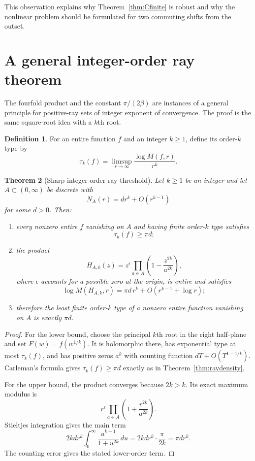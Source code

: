 \documentclass[11pt,oneside]{article}
\newtheorem{theorem}{Theorem}[section]
\theoremstyle{definition}
\newtheorem{definition}[theorem]{Definition}
\theoremstyle{remark}
\begin{document}
This observation explains why Theorem~\ref{thm:Cfinite} is robust and why the nonlinear
problem should be formulated for two commuting shifts from the outset.

\section{A general integer-order ray theorem}
\label{sec:generalray}

The fourfold product and the constant $\pi/(2\beta)$ are instances of a general principle
for positive-ray sets of integer exponent of convergence.  The proof is the same square-root
idea with a $k$th root.

\begin{definition}
For an entire function $f$ and an integer $k\ge1$, define its order-$k$ type by
\[
 \tau_k(f)=\limsup_{r\to\infty}\frac{\log M(f,r)}{r^k}.
\]
\end{definition}

\begin{theorem}[Sharp integer-order ray threshold]
\label{thm:generalray}
Let $k\ge1$ be an integer and let $A\subset(0,\infty)$ be discrete with
\begin{equation}
 N_A(r)=d r^k+O(r^{k-1})
 \label{eq:generalcount}
\end{equation}
for some $d>0$.  Then:
\begin{enumerate}
\item every nonzero entire $f$ vanishing on $A$ and having finite order-$k$ type satisfies
\[
 \tau_k(f)\ge\pi d;
\]
\item the product
\begin{equation}
 H_{A,k}(z)=z^{\epsilon}
 \prod_{a\in A}\left(1-\frac{z^{2k}}{a^{2k}}\right),
 \label{eq:generalproduct}
\end{equation}
where $\epsilon$ accounts for a possible zero at the origin, is entire and satisfies
\[
 \log M(H_{A,k},r)=\pi d\,r^k+O(r^{k-1}+\log r);
\]
\item therefore the least finite order-$k$ type of a nonzero entire function vanishing on
$A$ is exactly $\pi d$.
\end{enumerate}
\end{theorem}

\begin{proof}
For the lower bound, choose the principal $k$th root in the right half-plane and set
$F(w)=f(w^{1/k})$.  It is holomorphic there, has exponential type at most $\tau_k(f)$, and
has positive zeros $a^k$ with counting function $dT+O(T^{1-1/k})$.  Carleman's formula gives
$\tau_k(f)\ge\pi d$ exactly as in Theorem~\ref{thm:raydensity}.

For the upper bound, the product converges because $2k>k$.  Its exact maximum modulus is
\[
 r^{\epsilon}\prod_{a\in A}\left(1+\frac{r^{2k}}{a^{2k}}\right).
\]
Stieltjes integration gives the main term
\[
 2k d r^k\int_0^\infty\frac{u^{k-1}}{1+u^{2k}}\,du
 =2k d r^k\cdot\frac{\pi}{2k}=\pi d r^k.
\]
The counting error gives the stated lower-order term.
\end{proof}
\end{document}
